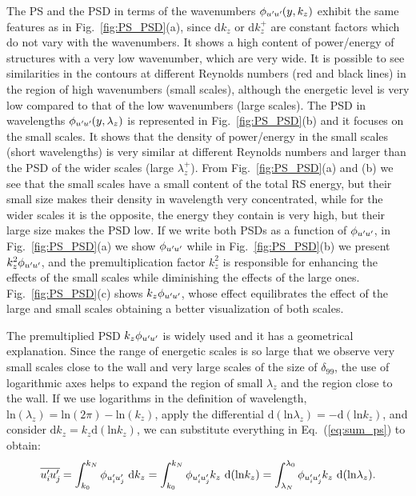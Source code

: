 The PS and the PSD in terms of the wavenumbers $\phi_{u^{\prime}\mkern-1.2mu u^{\prime}\mkern-1.2mu}(y,k_z)$ exhibit the same features as in Fig.~\ref{fig:PS_PSD}(a), since $\mathrm{d}k_z$ or $\mathrm{d}k_z^+$ are constant factors which do not vary with the wavenumbers. It shows a high content of power/energy of structures with a very low wavenumber, which are very wide. It is possible to see similarities in the contours at different Reynolds numbers (red and black lines) in the region of high wavenumbers (small scales), although the energetic level is very low compared to that of the low wavenumbers (large scales).
The PSD in wavelengths $\phi_{u^{\prime}\mkern-1.2mu u^{\prime}\mkern-1.2mu}(y,\lambda_z)$ is represented in Fig.~\ref{fig:PS_PSD}(b) and it focuses on the small scales. It shows that the density of power/energy in the small scales (short wavelengths) is very similar at different Reynolds numbers and larger than the PSD of the wider scales (large $\lambda_z^+$). 
From Fig.~\ref{fig:PS_PSD}(a) and (b) we see that the small scales have a small content of the total RS energy, but their small size makes their density in wavelength very concentrated, while for the wider scales it is the opposite, the energy they contain is very high, but their large size makes the PSD low.
If we write both PSDs as a function of $\phi_{u^{\prime}\mkern-1.2mu u^{\prime}\mkern-1.2mu}$, in Fig.~\ref{fig:PS_PSD}(a) we show $\phi_{u^{\prime}\mkern-1.2mu u^{\prime}\mkern-1.2mu}$ while in Fig.~\ref{fig:PS_PSD}(b) we present $k_z^2 \phi_{u^{\prime}\mkern-1.2mu u^{\prime}\mkern-1.2mu}$, and the premultiplication factor $k_z^2$ is responsible for enhancing the effects of the small scales while diminishing the effects of the large ones. Fig.~\ref{fig:PS_PSD}(c) shows $k_z \phi_{u^{\prime}\mkern-1.2mu u^{\prime}\mkern-1.2mu}$, whose effect equilibrates the effect of the large and small scales obtaining a better visualization of both scales.

The premultiplied PSD $k_z \phi_{u^{\prime}\mkern-1.2mu u^{\prime}\mkern-1.2mu}$ is widely used and it has a geometrical explanation.
Since the range of energetic scales is so large that we observe very small scales close to the wall and very large scales of the size of $\delta_{99}$, the use of logarithmic axes helps to expand the region of small $\lambda_z$ and the region close to the wall.
If we use logarithms in the definition of wavelength, $ \mathrm{ln}(\lambda_z) = \mathrm{ln}(2\pi) - \mathrm{ln}(k_z)$, apply the differential $\mathrm{d}(\mathrm{ln} \lambda_z) = -\mathrm{d}(\mathrm{ln} k_z)$, and consider $\mathrm{d}k_z = k_z \mathrm{d}(\mathrm{ln} k_z)$, we can substitute everything in Eq.~(\ref{eq:sum_ps}) to obtain:
\begin{equation}
    \overline{u_i^{\prime}\mkern-1.2mu u_j^{\prime}\mkern-1.2mu} = 
    \int_{k_0}^{k_{N}}   \phi_{u_i^{\prime}\mkern-1.2mu u_j^{\prime}\mkern-1.2mu}  ~ \mathrm{d} k_z = 
    \int_{k_0}^{k_{N}}   \phi_{u_i^{\prime}\mkern-1.2mu u_j^{\prime}\mkern-1.2mu} k_z  ~ \mathrm{d}( \mathrm{ln} k_z) = 
    \int^{\lambda_0}_{\lambda_{N}}   \phi_{u_i^{\prime}\mkern-1.2mu u_j^{\prime}\mkern-1.2mu} k_z ~ \mathrm{d}( \mathrm{ln} \lambda_z).
\end{equation}

